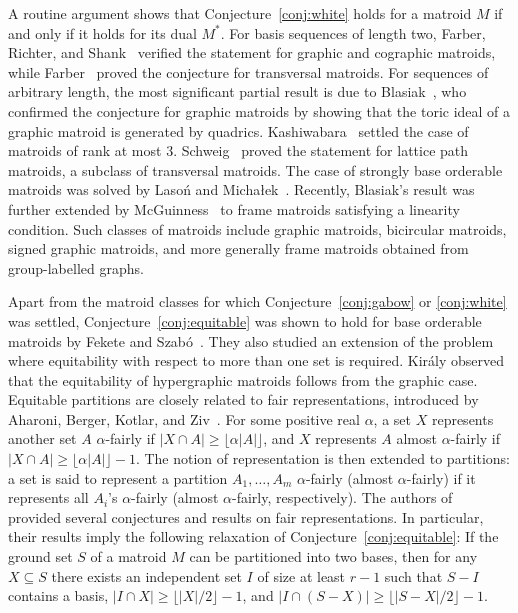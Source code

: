 \documentclass[11pt,a4paper]{article}
\theoremstyle{plain}
\theoremstyle{definition}
\newcommand{\tnote}[1]{{\color{blue}[{\tiny \textbf{Tamás:} \bf #1}]\marginpar{\color{blue}*}}}
\newcommand{\tnote}[1]{}
\begin{document}
A routine argument shows that Conjecture~\ref{conj:white} holds for a matroid $M$ if and only if it holds for its dual $M^*$. For basis sequences of length two, Farber, Richter, and Shank~\cite{farber1985edge} verified the statement for graphic and cographic matroids, while Farber~\cite{farber1989basis} proved the conjecture for transversal matroids. For sequences of arbitrary length, the most significant partial result is due to Blasiak~\cite{blasiak2008toric}, who confirmed the conjecture for graphic matroids by showing that the toric ideal of a graphic matroid is generated by quadrics. Kashiwabara~\cite{kashiwabara2010toric} settled the case of matroids of rank at most $3$. Schweig~\cite{schweig2011toric} proved the statement for lattice path matroids, a subclass of transversal matroids. The case of strongly base orderable matroids was solved by Laso{\'n} and Micha{\l}ek~\cite{lason2014toric}. Recently, Blasiak's result was further extended by McGuinness~\cite{mcguinness2020frame} to frame matroids satisfying a linearity condition. Such classes of matroids include graphic matroids, bicircular matroids, signed graphic matroids, and more generally frame matroids obtained from group-labelled graphs. 


Apart from the matroid classes for which Conjecture~\ref{conj:gabow} or \ref{conj:white} was settled, Conjecture~\ref{conj:equitable} was shown to hold for base orderable matroids by  Fekete and Szabó~\cite{fekete2011equitable}. They also studied an extension of the problem where equitability with respect to more than one set is required. Király \cite{egres_open_equit} observed that the equitability of hypergraphic matroids follows from the graphic case. Equitable partitions are closely related to fair representations, introduced by Aharoni, Berger, Kotlar, and Ziv~\cite{aharoni2017faira}. For some positive real $\alpha$, a set $X$ represents another set $A$ $\alpha$-fairly if $|X\cap A|\geq\lfloor\alpha|A|\rfloor$, and $X$ represents $A$ almost $\alpha$-fairly if $|X\cap A|\geq\lfloor\alpha|A|\rfloor-1$. The notion of representation is then extended to partitions: a set is said to represent a partition $A_1,\dots,A_m$ $\alpha$-fairly (almost $\alpha$-fairly) if it represents all $A_i$'s $\alpha$-fairly (almost $\alpha$-fairly, respectively). The authors of~\cite{aharoni2017faira} provided several conjectures and results on fair representations. In particular, their results imply the following relaxation of Conjecture~\ref{conj:equitable}: If the ground set $S$ of a matroid $M$ can be partitioned into two bases, then for any $X\subseteq S$ there exists an independent set $I$ of size at least $r-1$ such that $S-I$ contains a basis, $|I\cap X|\geq\lfloor|X|/2\rfloor-1$, and $|I\cap (S-X)|\geq\lfloor|S-X|/2\rfloor-1$.
\end{document}

